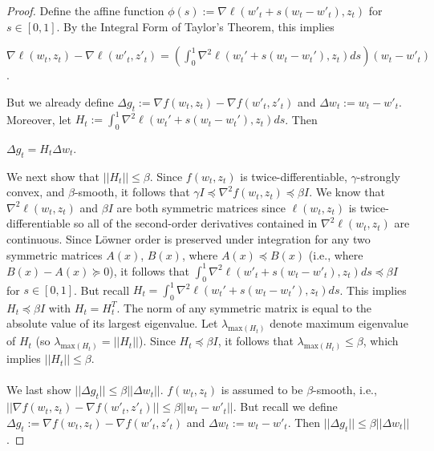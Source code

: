\documentclass[twoside,11pt]{article}
\begin{document}
\begin{proof}
Define the affine function $\phi(s) := \nabla \ell (w'_t + s(w_t - w'_t), z_t)$ for $s \in [0,1]$. By the Integral Form of Taylor's Theorem, this implies

\begin{center}
$\nabla \ell (w_t, z_t) - \nabla \ell (w'_t, z'_t) = (\int_{0}^{1} \nabla^2 \ell (w_t' + s(w_t - w_t'), z_t)ds)(w_t - w'_t)$.
\end{center}

\noindent
But we already define $\Delta g_t := \nabla f(w_t, z_t) - \nabla f(w'_t, z'_t)$ and $\Delta w_t := w_t - w'_t$. Moreover, let $H_t := \int_{0}^{1} \nabla^2 \ell (w_t' + s(w_t - w_t'), z_t)ds$. Then

\begin{center}
$\Delta g_t = H_t \Delta w_t$.
\end{center}

\noindent
We next show that $||H_t|| \leq \beta$. Since $f(w_t, z_t)$ is twice-differentiable, $\gamma$-strongly convex, and $\beta$-smooth, it follows that $\gamma I \preceq \nabla^2 f(w_t, z_t) \preceq \beta I$. We know that $\nabla^2 \ell (w_t, z_t)$ and $\beta I$ are both symmetric matrices since $\ell (w_t, z_t)$ is twice-differentiable so all of the second-order derivatives contained in $\nabla^2 \ell(w_t, z_t)$ are continuous. Since L\"{o}wner order is preserved under integration for any two symmetric matrices $A(x)$, $B(x)$, where $A(x) \preceq B(x)$ (i.e., where $B(x) - A(x) \succeq 0$), it follows that $\int_{0}^{1} \nabla^2 \ell (w'_t + s(w_t - w'_t), z_t)ds \preceq \beta I$ for $s \in [0,1]$. But recall $H_t = \int_{0}^{1} \nabla^2 \ell (w_t' + s(w_t - w_t'), z_t)ds$. This implies $H_t \preceq \beta I$ with $H_t = H^T_t$. The norm of any symmetric matrix is equal to the absolute value of its largest eigenvalue. Let $\lambda_{\text{max}(H_t)}$ denote maximum eigenvalue of $H_t$ (so $\lambda_{\text{max}(H_t)} = ||H_t||$). Since $H_t \preceq \beta I$, it follows that $\lambda_{\text{max}(H_t)} \leq \beta$, which implies $||H_t|| \leq \beta$. \\
\\
We last show $||\Delta g_t || \leq \beta ||\Delta w_t||$. $f(w_t, z_t)$ is assumed to be $\beta$-smooth, i.e., $||\nabla f(w_t,z_t) - \nabla f(w'_t,z'_t)|| \leq \beta ||w_t - w'_t||$. But recall we define $\Delta g_t := \nabla f(w_t,z_t) - \nabla f(w'_t,z'_t)$ and $\Delta w_t := w_t - w'_t$. Then $||\Delta g_t|| \leq \beta ||\Delta w_t||$.
\end{proof} 
\end{document}
